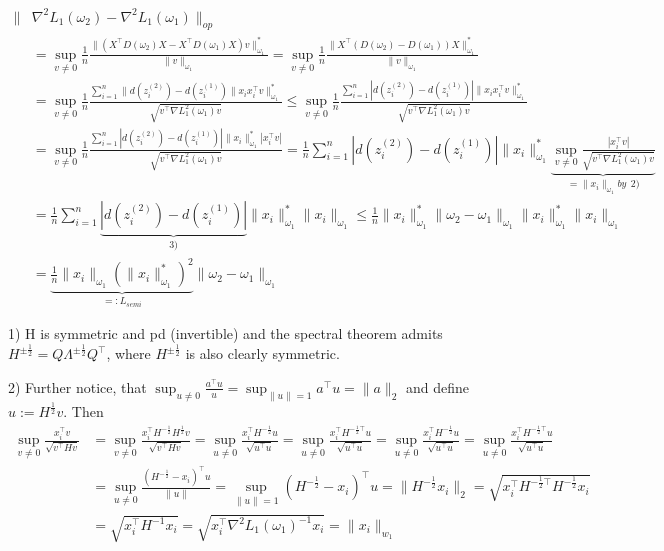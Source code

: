 \documentclass{article}
\begin{document}
\begin{align*}
  \| &\nabla ^2 L_1 (\omega _2) - \nabla ^2 L_1 (\omega _1)\|_{op} 
  \\
  &= \sup _{v\neq 0}\frac{1}{n} \frac{\|(X^\top D(\omega_2)X-X^\top D(\omega_1)X  ) v\|^{*}_{\omega_1}}{\|v\|_{\omega_1}}
  =\sup _{v\neq 0} \frac{1}{n} \frac{\| X^\top (D(\omega_2)-D(\omega_1)) X \|^{*}_{\omega_1}}{\|v\|_{\omega_1}}\\
  &= \sup_{v \neq 0} \frac{1}{n} \frac{\sum_{i=1}^{n} \| d(z_i ^{(2)}) - d(z_i ^{(1)}) \| x_i x_i ^\top v\|_{\omega_1}^{*}  }{\sqrt{v^\top \nabla L_1^2 (\omega_1) v}} 
  \leq \sup_{v \neq 0} \frac{1}{n} \frac{\sum_{i=1}^{n} | d(z_i ^{(2)}) - d(z_i ^{(1)})| \|x_i x_i ^\top v\|_{\omega_1}^{*}  }{\sqrt{v^\top \nabla L_1^2 (\omega_1) v}}\\
  &= \sup_{v \neq 0} \frac{1}{n} \frac{\sum_{i=1}^{n} | d(z_i ^{(2)}) - d(z_i ^{(1)})| \|x_i \|_{\omega_1}^{*} |x_i ^\top v|  }{\sqrt{v^\top \nabla L_1^2 (\omega_1) v}}
  =\frac{1}{n} \sum_{i=1}^{n} | d(z_i ^{(2)}) - d(z_i ^{(1)})| \|x_i \|_{\omega_1}^{*} \underbrace{\sup_{v \neq 0} \frac{ |x_i ^\top v|  }{\sqrt{v^\top \nabla L_1^2 (\omega_1) v}}}_{=\| x_i\|_{\omega_1} by \ \ 2)}\\
  &=  \frac{1}{n} \sum_{i=1}^{n} \underbrace{| d(z_i ^{(2)}) - d(z_i ^{(1)})|}_{3)} \|x_i \|_{\omega_1}^{*}  \| x_i\|_{\omega_1}
  \leq \frac{1}{n} \|x_i\|_{\omega _1}^* \|\omega_2-\omega_1\|_{\omega_1} \|x_i\|_{\omega _1}^* \| x_i\|_{\omega_1}\\
  &= \underbrace{\frac{1}{n} \| x_i\|_{\omega_1} (\|x_i\|_{\omega _1}^*)^2}_{=:L_{semi}} \|\omega_2-\omega_1\|_{\omega_1} 
\end{align*}


1) H is symmetric and pd (invertible) and the spectral theorem admits $H^{\pm\frac{1}{2}} = Q \Lambda ^{\pm\frac{1}{2}} Q^\top$, where $H^{\pm\frac{1}{2}}$ is also clearly symmetric.

2) Further notice, that 
$ \sup_{u\neq 0} \frac{a^\top u}{u} = \sup_{\|u\|=1} a^\top u= \|a\|_2$ and define $u:= H ^{\frac{1}{2}}v$. Then
\begin{align*}
  \sup_{v\neq 0} \frac{x_i^\top v}{\sqrt{v^\top Hv }}
  &=\sup_{v\neq 0} \frac{x_i^\top H ^{-\frac{1}{2}} H ^{\frac{1}{2}}v}{\sqrt{v^\top Hv }}
  =\sup_{u\neq 0} \frac{x_i^\top H^{-\frac{1}{2}}u}{\sqrt{u ^\top u}}
  = \sup_{u\neq 0} \frac{x_i^\top H^{-\frac{1}{2} \top} u}{\sqrt{u ^\top u}}%
  = \sup_{u\neq 0} \frac{x_i^\top H^{-\frac{1}{2}} u}{\sqrt{u ^\top u}}
  = \sup _{u\neq 0} \frac{x_i^\top H^{-\frac{1}{2} \top} u}{\sqrt{u ^\top u}}\\
  &= \sup_{u\neq 0} \frac{(H^{-\frac{1}{2}} - x_i)^ \top u}{\|u\|}
  = \sup _{\|u\|=1} (H^{-\frac{1}{2}} - x_i)^\top u
  = \|H^{-\frac{1}{2}} x_i\|_2 
  = \sqrt{x_i ^\top H^{-\frac{1}{2}\top} H^{-\frac{1}{2}} x_i}\\
  &= \sqrt{x_i^\top H^{-1}x_i} 
  = \sqrt{x_i^\top \nabla^2 L_1 (\omega_1) ^{-1}x_i}  = \|x_i\|_{w_1}
\end{align*}
\end{document}
